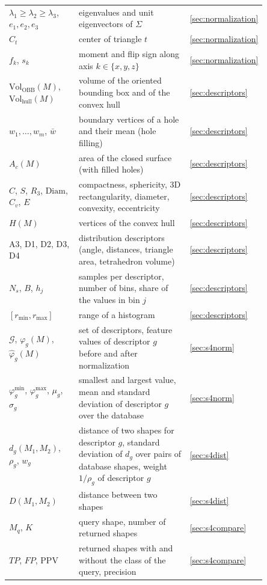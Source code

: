 \documentclass[10pt,a4paper]{article}
\begin{document}
\begin{table}[htbp]
\begin{tabular}{@{}p{0.30\linewidth}p{0.55\linewidth}l@{}}
$\lambda_1\ge\lambda_2\ge\lambda_3$, $e_1,e_2,e_3$ & eigenvalues and unit eigenvectors of $\Sigma$ & \ref{sec:normalization}\\
$C_t$ & center of triangle $t$ & \ref{sec:normalization}\\
$f_k$, $s_k$ & moment and flip sign along axis $k\in\{x,y,z\}$ & \ref{sec:normalization}\\
$\mathrm{Vol}_{\mathrm{OBB}}(M)$, $\mathrm{Vol}_{\mathrm{hull}}(M)$ & volume of the oriented bounding box and of the convex hull & \ref{sec:descriptors}\\
$w_1,\ldots,w_m$, $\bar w$ & boundary vertices of a hole and their mean (hole filling) & \ref{sec:descriptors}\\
$A_c(M)$ & area of the closed surface (with filled holes) & \ref{sec:descriptors}\\
$C$, $S$, $R_3$, $\mathrm{Diam}$, $C_v$, $E$ & compactness, sphericity, 3D rectangularity, diameter, convexity, eccentricity & \ref{sec:descriptors}\\
$H(M)$ & vertices of the convex hull & \ref{sec:descriptors}\\
A3, D1, D2, D3, D4 & distribution descriptors (angle, distances, triangle area, tetrahedron volume) & \ref{sec:descriptors}\\
$N_s$, $B$, $h_j$ & samples per descriptor, number of bins, share of the values in bin $j$ & \ref{sec:descriptors}\\
$[r_{\min},r_{\max}]$ & range of a histogram & \ref{sec:descriptors}\\
$\mathcal{G}$, $\varphi_g(M)$, $\hat\varphi_g(M)$ & set of descriptors, feature values of descriptor $g$ before and after normalization & \ref{sec:s4norm}\\
$\varphi_g^{\min}$, $\varphi_g^{\max}$, $\mu_g$, $\sigma_g$ & smallest and largest value, mean and standard deviation of descriptor $g$ over the database & \ref{sec:s4norm}\\
$d_g(M_1,M_2)$, $\rho_g$, $w_g$ & distance of two shapes for descriptor $g$, standard deviation of $d_g$ over pairs of database shapes, weight $1/\rho_g$ of descriptor $g$ & \ref{sec:s4dist}\\
$D(M_1,M_2)$ & distance between two shapes & \ref{sec:s4dist}\\
$M_q$, $K$ & query shape, number of returned shapes & \ref{sec:s4compare}\\
$TP$, $FP$, PPV & returned shapes with and without the class of the query, precision & \ref{sec:s4compare}\\

\end{tabular}
\end{table}
\end{document}
